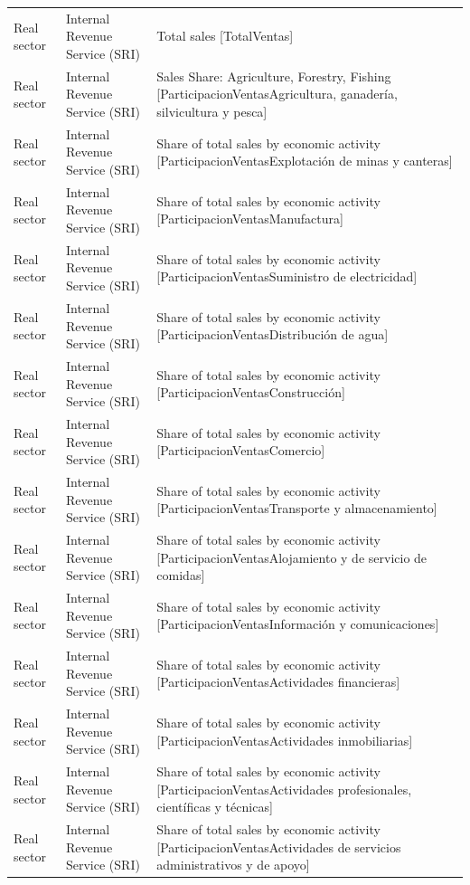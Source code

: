 \documentclass[10pt,a4paper]{article}
\begin{document}
\begin{longtable}{@{}>{\raggedright\arraybackslash}p{3.5cm}>{\raggedright\arraybackslash}p{5.6cm}>{\raggedright\arraybackslash}p{\dimexpr\textwidth-9.1cm-4\tabcolsep\relax}@{}}
Real sector & Internal Revenue Service (SRI) & Total sales [TotalVentas]\\
Real sector & Internal Revenue Service (SRI) & Sales Share: Agriculture, Forestry, Fishing [ParticipacionVentasAgricultura, ganader\'{i}a, silvicultura y pesca]\\
Real sector & Internal Revenue Service (SRI) & Share of total sales by economic activity [ParticipacionVentasExplotaci\'{o}n de minas y canteras]\\
Real sector & Internal Revenue Service (SRI) & Share of total sales by economic activity [ParticipacionVentasManufactura]\\
Real sector & Internal Revenue Service (SRI) & Share of total sales by economic activity [ParticipacionVentasSuministro de electricidad]\\
Real sector & Internal Revenue Service (SRI) & Share of total sales by economic activity [ParticipacionVentasDistribuci\'{o}n de agua]\\
Real sector & Internal Revenue Service (SRI) & Share of total sales by economic activity [ParticipacionVentasConstrucci\'{o}n]\\
Real sector & Internal Revenue Service (SRI) & Share of total sales by economic activity [ParticipacionVentasComercio]\\
Real sector & Internal Revenue Service (SRI) & Share of total sales by economic activity [ParticipacionVentasTransporte y almacenamiento]\\
Real sector & Internal Revenue Service (SRI) & Share of total sales by economic activity [ParticipacionVentasAlojamiento y de servicio de comidas]\\
Real sector & Internal Revenue Service (SRI) & Share of total sales by economic activity [ParticipacionVentasInformaci\'{o}n y comunicaciones]\\
Real sector & Internal Revenue Service (SRI) & Share of total sales by economic activity [ParticipacionVentasActividades financieras]\\
Real sector & Internal Revenue Service (SRI) & Share of total sales by economic activity [ParticipacionVentasActividades inmobiliarias]\\
Real sector & Internal Revenue Service (SRI) & Share of total sales by economic activity [ParticipacionVentasActividades profesionales, cient\'{i}ficas y t\'{e}cnicas]\\
Real sector & Internal Revenue Service (SRI) & Share of total sales by economic activity [ParticipacionVentasActividades de servicios administrativos y de apoyo]\\

\end{longtable}
\end{document}
